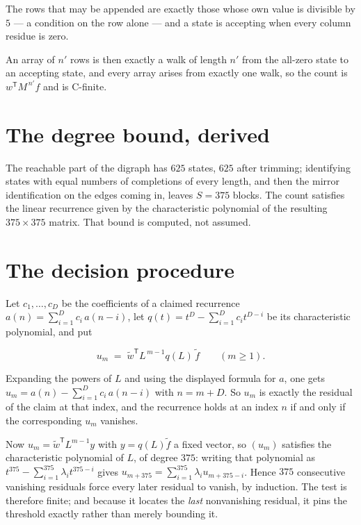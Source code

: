 \documentclass[11pt]{article}
\theoremstyle{definition}
\begin{document}
The rows that may be appended are exactly those whose own value is divisible by $5$ --- a condition on the row alone --- and a state is accepting when every column residue is zero.

An array of $n'$ rows is then exactly a walk of length $n'$ from the all-zero state to an accepting state, and every array arises from exactly one walk, so the count is $w^{\mathsf T}M^{\,n'}f$ and is C-finite.

\section{The degree bound, derived}

The reachable part of the digraph has $625$ states, $625$ after trimming; identifying states with equal numbers of completions of every length, and then the mirror identification on the edges coming in, leaves $S = 375$ blocks. The count satisfies the linear recurrence given by the characteristic polynomial of the resulting $375\times375$ matrix. That bound is computed, not assumed.

\section{The decision procedure}

Let $c_1,\dots,c_D$ be the coefficients of a claimed recurrence $a(n) = \sum_{i=1}^{D} c_i\,a(n-i)$, let $q(t) = t^{D} - \sum_{i=1}^{D} c_i t^{D-i}$ be its characteristic polynomial, and put

\[u_m \;=\; \tilde w^{\mathsf T} L^{\,m-1} q(L)\,\tilde f \qquad (m \ge 1).\]

Expanding the powers of $L$ and using the displayed formula for $a$, one gets $u_m = a(n) - \sum_{i=1}^{D} c_i\,a(n-i)$ with $n = m + D$. So $u_m$ is exactly the residual of the claim at that index, and the recurrence holds at an index $n$ if and only if the corresponding $u_m$ vanishes.

Now $u_m = \tilde w^{\mathsf T} L^{m-1} y$ with $y = q(L)\tilde f$ a fixed vector, so $(u_m)$ satisfies the characteristic polynomial of $L$, of degree $375$: writing that polynomial as $t^{375} - \sum_{i=1}^{375} \lambda_i t^{375-i}$ gives $u_{m+375} = \sum_{i=1}^{375} \lambda_i u_{m+375-i}$. Hence $375$ consecutive vanishing residuals force every later residual to vanish, by induction. The test is therefore finite; and because it locates the {\itshape last} nonvanishing residual, it pins the threshold exactly rather than merely bounding it.
\end{document}
